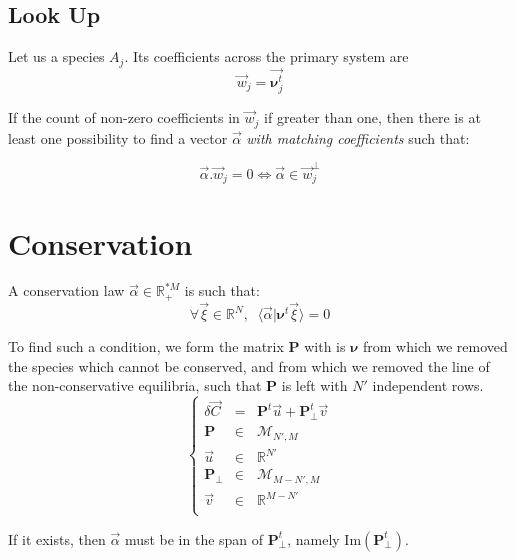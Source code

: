 \documentclass[aps,12pt]{revtex4}
\begin{document}
\subsection{Look Up}
Let us a species $A_j$. Its coefficients across the
primary system are
\begin{equation}
	\vec{w}_j = \vec{\bm{\nu}^t_{j}}
\end{equation}

If the count of non-zero coefficients in  $\vec{w}_j$ if greater than one,
then there is at least one possibility to find a vector $\vec{\alpha}$ \emph{with matching coefficients} such
that:

\begin{equation}
	\vec{\alpha}.\vec{w}_j=0 \Leftrightarrow \vec{\alpha} \in \vec{w}_j^\perp
\end{equation}

\section{Conservation}


A conservation law $\vec{\alpha}\in\mathbb{R}_+^{*M}$ is such that:
\begin{equation}
	\forall \vec{\xi} \in \mathbb{R}^N, \;\; \langle \vec{\alpha} \vert \bm{\nu}^t \vec{\xi} \rangle = 0
\end{equation}

To find such a condition, we form the matrix $\bm{P}$ with is $\bm{\nu}$ from which we removed the species
which cannot be conserved, and from which we removed the line of the non-conservative equilibria, 
such that $\bm{P}$ is left with $N'$ independent rows.
\begin{equation}
\left \lbrace
\begin{array}{rcl}
\delta\vec{C} & = & \bm{P}^t\vec{u} + \bm{P}_\perp^t \vec{v} \\
\bm{P}       & \in & \mathcal{M}_{N',M}\\
\vec{u}      & \in & \mathbb{R}^{N'}\\
\bm{P}_\perp & \in & \mathcal{M}_{M-N',M}\\
\vec{v}      & \in & \mathbb{R}^{M-N'}     \\
\end{array}
\right .
\end{equation}

If it exists, then $\vec{\alpha}$ must be in the span of $\bm{P}_\perp^t$, namely $\mathrm{Im}\left(\bm{P}_\perp^t\right)$.
\end{document}
